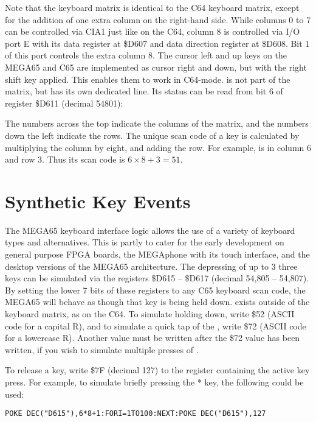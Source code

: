 Note that the keyboard matrix is identical to the C64 keyboard matrix, except for the addition of one extra column
on the right-hand side.  While columns 0 to 7 can be controlled via CIA1 just like on the C64, column 8 is controlled
via I/O port E with its data register at \$D607 and data direction register at \$D608.  Bit 1 of this port controls 
the extra column 8.  The cursor left and up keys on the MEGA65 and C65 are implemented as cursor right and down, but
with the right shift key applied.  This enables them to work in C64-mode.   is not
part of the matrix, but has its own dedicated line.  Its status can be read from bit 6 of register \$D611 (decimal 54801):

The numbers across the top indicate the columns of the matrix, and the numbers down the left indicate the rows.
The unique scan code of a key is calculated by multiplying the column by eight, and adding the row.  For example,
 is in column 6 and row 3. Thus its scan code is $6 \times 8 + 3 = 51$.

\section{Synthetic Key Events}

The MEGA65 keyboard interface logic allows the use of a variety of keyboard types and alternatives. This is partly
to cater for the early development on general purpose FPGA boards, the MEGAphone with its touch interface, and the
desktop versions of the MEGA65 architecture.  The depressing of up to 3 three keys can be simulated via
the registers \$D615 -- \$D617 (decimal 54,805 -- 54,807).  By setting the
lower 7 bits of these registers to any C65 keyboard scan code, the MEGA65 will behave as though that key is being
held down.  exists outside of the keyboard matrix, as on the C64.  To simulate
holding  down, write \$52 (ASCII code for a capital R), and to simulate a quick tap
of the , write \$72 (ASCII code for a lowercase R).  Another value must be written after the
\$72 value has been written, if you wish to simulate multiple presses of .

To release a key, write \$7F (decimal 127) to the register containing the active key press. For example,
to simulate briefly pressing the * key, the following could be used:

\begin{tcolorbox}[colback=black,coltext=white]
\verbatimfont{\codefont}
\begin{verbatim}
POKE DEC("D615"),6*8+1:FORI=1TO100:NEXT:POKE DEC("D615"),127
\end{verbatim}
\end{tcolorbox}


